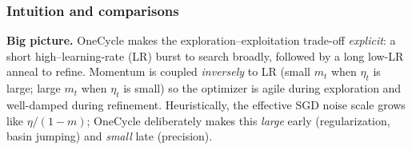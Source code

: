 \begin{enrichment}
	\subsubsection{Intuition and comparisons}
	\label{enr:subsubsec_chapter10_onecycle_intuition}
	
	\noindent\textbf{Big picture.} OneCycle makes the exploration–exploitation trade-off \emph{explicit}: a short high–learning-rate (LR) burst to search broadly, followed by a long low-LR anneal to refine. Momentum is coupled \emph{inversely} to LR (small $m_t$ when $\eta_t$ is large; large $m_t$ when $\eta_t$ is small) so the optimizer is agile during exploration and well-damped during refinement. Heuristically, the effective SGD noise scale grows like $\eta/(1-m)$; OneCycle deliberately makes this \emph{large} early (regularization, basin jumping) and \emph{small} late (precision).
	

\end{enrichment}
